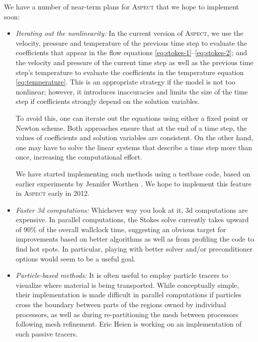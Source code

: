 \documentclass{article}
\newcommand{\aspect}{\textsc{Aspect}}
\begin{document}
We have a number of near-term plans for \aspect{} that we hope to implement
soon:
\begin{itemize}
\item \textit{Iterating out the nonlinearity:} In the current version of
  \aspect{}, we use the velocity, pressure and temperature of the previous
  time step to evaluate the coefficients that appear in the flow equations
  \eqref{eq:stokes-1}--\eqref{eq:stokes-2}; and the velocity and pressure of
  the current time step as well as the previous time step's temperature to
  evaluate the coefficients in the temperature equation
  \eqref{eq:temperature}. This is an appropriate strategy if the model is not
  too nonlinear; however, it introduces inaccuracies and limits the size of
  the time step if coefficients strongly depend on the solution variables.

  To avoid this, one can iterate out the equations using either a fixed point
  or Newton scheme. Both approaches ensure that at the end of a time step, the
  values of coefficients and solution variables are consistent. On the other
  hand, one may have to solve the linear systems that describe a time step
  more than once, increasing the computational effort.

  We have started implementing such methods using a testbase code, based on
  earlier experiments by Jennifer Worthen \cite{Wor12}. We hope to implement
  this feature in \aspect{} early in 2012.

\item \textit{Faster 3d computations:} Whichever way you look at it, 3d
  computations are expensive. In parallel computations, the Stokes solve
  currently takes upward of 90\% of the overall wallclock time, suggesting an
  obvious target for improvements based on better algorithms as well as from
  profiling the code to find hot spots. In particular, playing with better
  solver and/or preconditioner options would seem to be a useful goal.

\item \textit{Particle-based methods:} It is often useful to employ particle
  tracers to visualize where material is being transported. While conceptually
  simple, their implementation is made difficult in parallel computations
  if particles cross the boundary between parts of the regions owned by
  individual processors, as well as during re-partitioning the mesh between
  processors following mesh refinement. Eric Heien is
  working on an implementation of such passive tracers.


\end{itemize}
\end{document}
